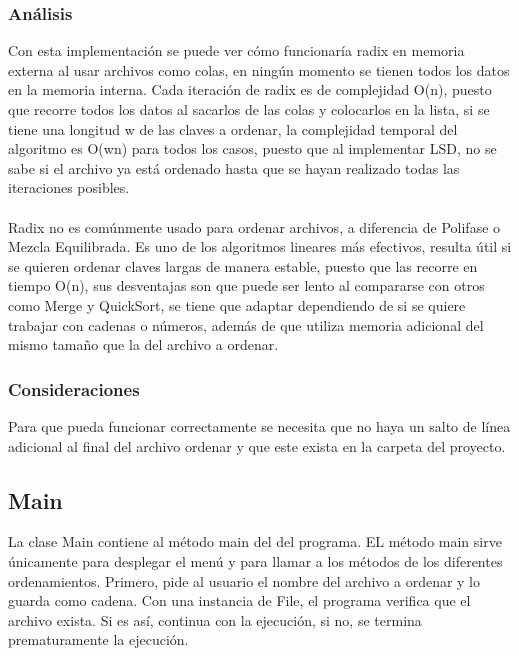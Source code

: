 \documentclass[11pt]{article}
\begin{document}
\subsubsection{Análisis}
Con esta implementación se puede ver cómo funcionaría radix en memoria externa al usar archivos como colas, en ningún momento se tienen todos los datos en la memoria interna. Cada iteración de radix es de complejidad O(n), puesto que recorre todos los datos al sacarlos de las colas y colocarlos en la lista, si se tiene una longitud w de las claves a ordenar, la complejidad temporal del algoritmo es O(wn) para todos los casos, puesto que al implementar LSD, no se sabe si el archivo ya está ordenado hasta que se hayan realizado todas las iteraciones posibles. 
\paragraph{}
Radix no es comúnmente usado para ordenar archivos, a diferencia de Polifase o Mezcla Equilibrada. Es uno de los algoritmos lineares más efectivos, resulta útil si se quieren ordenar claves largas de manera estable, puesto que las recorre en tiempo O(n), sus desventajas son que puede ser lento al compararse con otros como Merge y QuickSort, se tiene que adaptar dependiendo de si se quiere trabajar con cadenas o números, además de que utiliza memoria adicional del mismo tamaño que la del archivo a ordenar. 

\subsubsection{Consideraciones}
Para que pueda funcionar correctamente se necesita que no haya un salto de línea adicional al final del archivo ordenar y que este exista en la carpeta del proyecto. 

\subsection{Main}
La clase Main contiene al método main del del programa. EL método main sirve únicamente para desplegar el menú y para llamar a los métodos de los diferentes ordenamientos. Primero, pide al usuario el nombre del archivo a ordenar y lo guarda como cadena. Con una instancia de File, el programa verifica que el archivo exista. Si es así, continua con la ejecución, si no, se termina prematuramente la ejecución.
\end{document}
